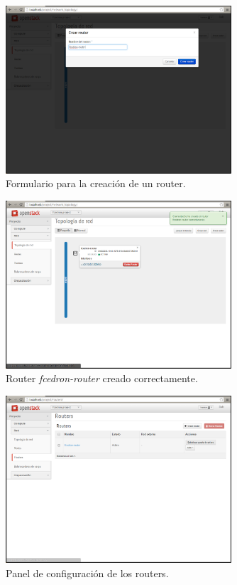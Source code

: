\documentclass{article}
\begin{document}
\begin{figure}[h]
  \centering
    \includegraphics[width=0.75\textwidth]{img/m_012.png}
  \caption{Formulario para la creación de un router.}
  \label{fig:FormCreateRouter}
\end{figure}

\begin{figure}[h]
  \centering
    \includegraphics[width=0.75\textwidth]{img/m_013.png}
  \caption{Router \emph{fcedron-router} creado correctamente.}
  \label{fig:NetworkAndRouter}
\end{figure}

\begin{figure}[h]
  \centering
    \includegraphics[width=0.75\textwidth]{img/m_015.png}
  \caption{Panel de configuración de los routers.}
  \label{fig:Routers}
\end{figure}
\end{document}
